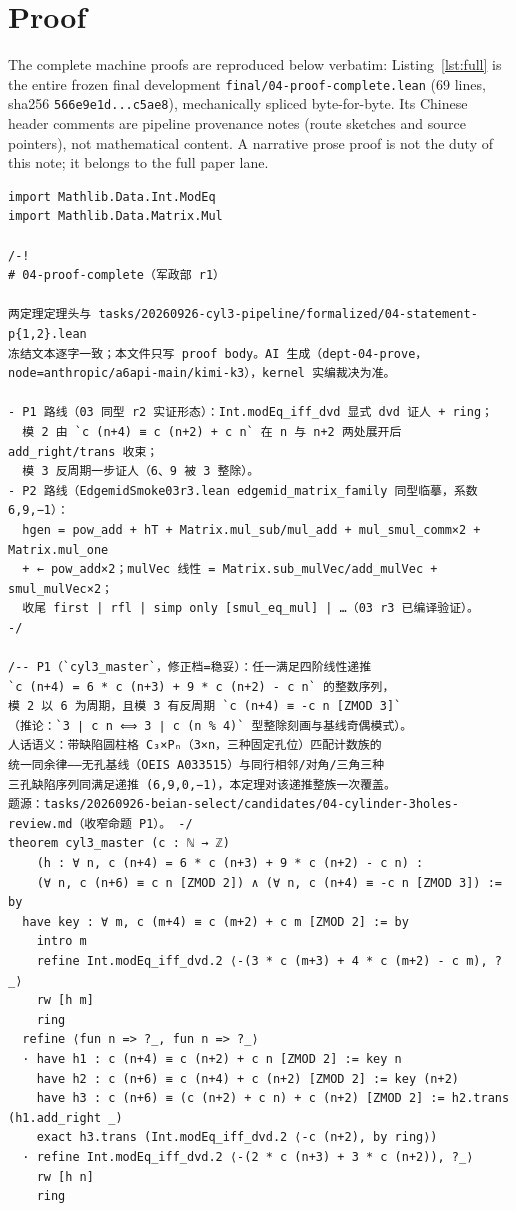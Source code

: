 \documentclass[11pt]{article}
\begin{document}
\section{Proof}

The complete machine proofs are reproduced below verbatim:
Listing~\ref{lst:full} is the entire frozen final development
\texttt{final/04-proof-complete.lean} (69 lines, sha256
\texttt{566e9e1d...c5ae8}), mechanically spliced byte-for-byte. Its Chinese
header comments are pipeline provenance notes (route sketches and source
pointers), not mathematical content. A narrative prose proof is not the
duty of this note; it belongs to the full paper lane.

\begin{lstlisting}[caption={Complete development, verbatim: lines 1--69 (the whole file) of the frozen \texttt{final/04-proof-complete.lean}, sha256 \texttt{566e9e1d...c5ae8}.},label={lst:full}]
import Mathlib.Data.Int.ModEq
import Mathlib.Data.Matrix.Mul

/-!
# 04-proof-complete（军政部 r1）

两定理定理头与 tasks/20260926-cyl3-pipeline/formalized/04-statement-p{1,2}.lean
冻结文本逐字一致；本文件只写 proof body。AI 生成（dept-04-prove，
node=anthropic/a6api-main/kimi-k3），kernel 实编裁决为准。

- P1 路线（03 同型 r2 实证形态）：Int.modEq_iff_dvd 显式 dvd 证人 + ring；
  模 2 由 `c (n+4) ≡ c (n+2) + c n` 在 n 与 n+2 两处展开后 add_right/trans 收束；
  模 3 反周期一步证人（6、9 被 3 整除）。
- P2 路线（EdgemidSmoke03r3.lean edgemid_matrix_family 同型临摹，系数 6,9,−1）：
  hgen = pow_add + hT + Matrix.mul_sub/mul_add + mul_smul_comm×2 + Matrix.mul_one
  + ← pow_add×2；mulVec 线性 = Matrix.sub_mulVec/add_mulVec + smul_mulVec×2；
  收尾 first | rfl | simp only [smul_eq_mul] | …（03 r3 已编译验证）。
-/

/-- P1（`cyl3_master`，修正档=稳妥）：任一满足四阶线性递推
`c (n+4) = 6 * c (n+3) + 9 * c (n+2) - c n` 的整数序列，
模 2 以 6 为周期，且模 3 有反周期 `c (n+4) ≡ -c n [ZMOD 3]`
（推论：`3 ∣ c n ⟺ 3 ∣ c (n % 4)` 型整除刻画与基线奇偶模式）。
人话语义：带缺陷圆柱格 C₃×Pₙ（3×n，三种固定孔位）匹配计数族的
统一同余律——无孔基线（OEIS A033515）与同行相邻/对角/三角三种
三孔缺陷序列同满足递推 (6,9,0,−1)，本定理对该递推整族一次覆盖。
题源：tasks/20260926-beian-select/candidates/04-cylinder-3holes-review.md（收窄命题 P1）。 -/
theorem cyl3_master (c : ℕ → ℤ)
    (h : ∀ n, c (n+4) = 6 * c (n+3) + 9 * c (n+2) - c n) :
    (∀ n, c (n+6) ≡ c n [ZMOD 2]) ∧ (∀ n, c (n+4) ≡ -c n [ZMOD 3]) := by
  have key : ∀ m, c (m+4) ≡ c (m+2) + c m [ZMOD 2] := by
    intro m
    refine Int.modEq_iff_dvd.2 ⟨-(3 * c (m+3) + 4 * c (m+2) - c m), ?_⟩
    rw [h m]
    ring
  refine ⟨fun n => ?_, fun n => ?_⟩
  · have h1 : c (n+4) ≡ c (n+2) + c n [ZMOD 2] := key n
    have h2 : c (n+6) ≡ c (n+4) + c (n+2) [ZMOD 2] := key (n+2)
    have h3 : c (n+6) ≡ (c (n+2) + c n) + c (n+2) [ZMOD 2] := h2.trans (h1.add_right _)
    exact h3.trans (Int.modEq_iff_dvd.2 ⟨-c (n+2), by ring⟩)
  · refine Int.modEq_iff_dvd.2 ⟨-(2 * c (n+3) + 3 * c (n+2)), ?_⟩
    rw [h n]
    ring


\end{lstlisting}
\end{document}
